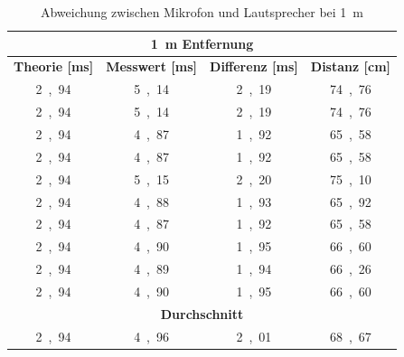 \begin{table}[H]
\centering
\caption{Abweichung zwischen Mikrofon und Lautsprecher bei \SI{1}{m}}
\label{tab:modul_D_1}
\begin{tabular}{|c|c|c|c|}
\hline
\multicolumn{4}{|c|}{\textbf{\SI{1}{\m} Entfernung}}                                                                                                              \\ \hline
\textbf{Theorie [\si{ms}]} & \textbf{Messwert [\si{ms}]} & \multicolumn{1}{l|}{\textbf{Differenz [\si{ms}]}} & \multicolumn{1}{l|}{\textbf{Distanz [\si{cm}]}} \\ \hline
\si{2,94}	 & 	\si{5,14}	 & 	\si{2,19}	 & 	\si{74,76}	 \\ \hline
\si{2,94}	 & 	\si{5,14}	 & 	\si{2,19}	 & 	\si{74,76}	 \\ \hline
\si{2,94}	 & 	\si{4,87}	 & 	\si{1,92}	 & 	\si{65,58}	 \\ \hline
\si{2,94}	 & 	\si{4,87}	 & 	\si{1,92}	 & 	\si{65,58}	 \\ \hline
\si{2,94}	 & 	\si{5,15}	 & 	\si{2,20}	 & 	\si{75,10}	 \\ \hline
\si{2,94}	 & 	\si{4,88}	 & 	\si{1,93}	 & 	\si{65,92}	 \\ \hline
\si{2,94}	 & 	\si{4,87}	 & 	\si{1,92}	 & 	\si{65,58}	 \\ \hline
\si{2,94}	 & 	\si{4,90}	 & 	\si{1,95}	 & 	\si{66,60}	 \\ \hline
\si{2,94}	 & 	\si{4,89}	 & 	\si{1,94}	 & 	\si{66,26}	 \\ \hline
\si{2,94}	 & 	\si{4,90}	 & 	\si{1,95}	 & 	\si{66,60}	 \\ \hline
\multicolumn{4}{|c|}{\textbf{Durchschnitt}}                                                                                                                \\ \hline
\si{2,94}	 & 	\si{4,96}	 & 	\si{2,01}	 & 	\si{68,67}	 \\ \hline
\end{tabular}
\end{table}

